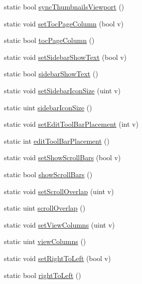 \begin{DoxyCompactItemize}
\item 
static bool \hyperlink{classOkular_1_1Settings_ae4432b68ddec383271f1c029a98ea25b}{sync\+Thumbnails\+Viewport} ()
\item 
static void \hyperlink{classOkular_1_1Settings_a975bccf08290bf6f97735987c92ad015}{set\+Toc\+Page\+Column} (bool v)
\item 
static bool \hyperlink{classOkular_1_1Settings_abe5d7b63d6699c52a18f6a9e8bf15d5d}{toc\+Page\+Column} ()
\item 
static void \hyperlink{classOkular_1_1Settings_a5c226998bb3eca971c5e05b837624501}{set\+Sidebar\+Show\+Text} (bool v)
\item 
static bool \hyperlink{classOkular_1_1Settings_ac62d059c9ffd6c8a6ed9da3fd5bbcb7b}{sidebar\+Show\+Text} ()
\item 
static void \hyperlink{classOkular_1_1Settings_a5c5890960220a70555c197778fa3f1d0}{set\+Sidebar\+Icon\+Size} (uint v)
\item 
static uint \hyperlink{classOkular_1_1Settings_a7315fd4eb5b604d22ca0b4b0ac6231fc}{sidebar\+Icon\+Size} ()
\item 
static void \hyperlink{classOkular_1_1Settings_a0ab95131586cd41841542721cfd996d7}{set\+Edit\+Tool\+Bar\+Placement} (int v)
\item 
static int \hyperlink{classOkular_1_1Settings_ac46060432d448d647a00ef303afbf85c}{edit\+Tool\+Bar\+Placement} ()
\item 
static void \hyperlink{classOkular_1_1Settings_a5243acd4d46eca4f2cb0515b67680027}{set\+Show\+Scroll\+Bars} (bool v)
\item 
static bool \hyperlink{classOkular_1_1Settings_ac42d4fae1c334be5db9cd30193290b04}{show\+Scroll\+Bars} ()
\item 
static void \hyperlink{classOkular_1_1Settings_a7bd6c45d7c542a6b3a129f46231ff6b4}{set\+Scroll\+Overlap} (uint v)
\item 
static uint \hyperlink{classOkular_1_1Settings_a46888e5e74e4c3f178445f788b4c3408}{scroll\+Overlap} ()
\item 
static void \hyperlink{classOkular_1_1Settings_ae97c3a89d51cce33efb817b10038bfba}{set\+View\+Columns} (uint v)
\item 
static uint \hyperlink{classOkular_1_1Settings_a89ff1e2d74235c7f591473a1976d343f}{view\+Columns} ()
\item 
static void \hyperlink{classOkular_1_1Settings_a7496167c7b4a22184a4836f6acb0f643}{set\+Right\+To\+Left} (bool v)
\item 
static bool \hyperlink{classOkular_1_1Settings_a809dd5c4f2d3fc1cf85f6852ff264611}{right\+To\+Left} ()

\end{DoxyCompactItemize}
